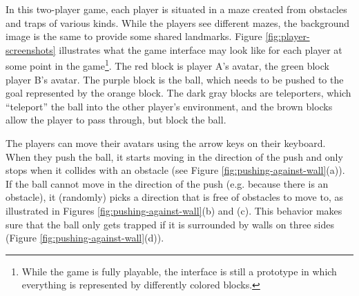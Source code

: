 In this two-player game, each player is situated in a maze created
from obstacles and traps of various kinds. While the players see
different mazes, the background image is the same to provide some
shared landmarks. Figure
\ref{fig:player-screenshots} illustrates what the game interface may
look like for each player at some point in the game\footnote{While the
  game is fully playable, the interface is still a prototype in which
  everything is represented by differently colored blocks.}. The red
block is player A's avatar, the green block player B's avatar. The
purple block is the ball, which needs to be pushed to the goal
represented by the orange block. The dark gray blocks are teleporters,
which ``teleport'' the ball into the other player's environment, and
the brown blocks allow the player to pass through, but block the ball.



The players can move their avatars using the arrow keys on their
keyboard. When they push the ball, it starts moving in the direction
of the push and only stops when it collides with an obstacle (see
Figure \ref{fig:pushing-against-wall}(a)). If the
ball cannot move in the direction of the push (e.g. because there is
an obstacle), it (randomly) picks a direction that is free of
obstacles to move to, as illustrated in Figures
\ref{fig:pushing-against-wall}(b) and (c). This behavior makes sure
that the ball only gets trapped if it is surrounded by walls on three
sides (Figure \ref{fig:pushing-against-wall}(d)).

